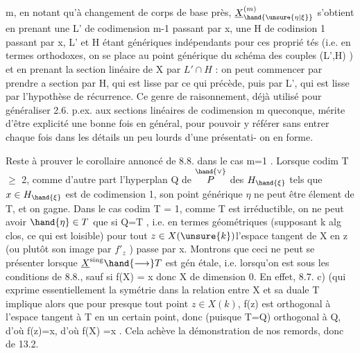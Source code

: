 
\placedmargin{|}m, en notant qu'à changement de corps de base près, $\underline{X}^{(m)}_{\hand{\unsure{\eta|\xi}}}$ s'obtient en
prenant une L' de codimension m-1 passant par x, une H de codinsion
1 passant par x, L' et H étant génériques indépendants pour ces proprié
tés (i.e. en termes orthodoxes, on se place au point générique du 
schéma des couples (L',H)  ) et en prenant la section linéaire
de X par $L'\cap H$ : on peut commencer par prendre a section par H, qui
est lisse par ce qui précède, puis par L', qui est lisse par l'hypothèse
de récurrence. Ce genre de raisonnement, déjà utilisé pour généraliser
2.6. p.ex. aux sections linéaires de codimension m queconque, mérite
d'être explicité une bonne fois en général, pour pouvoir y référer sans
entrer  chaque fois dans les détails un peu lourds d'une présentati-%
on en forme.

Reste à prouver le corollaire annoncé de 8.8. dans le cas m=1 .
Lorsque  codim T $\geqslant$ 2, comme d'autre part l'hyperplan Q de $\overset{\hand{\vee}}{P}$ des
$H_{\hand{\xi}}$ tels que $x\in H_{\hand{\xi}}$ est de codimension 1, son point générique $\eta$ ne peut
être élement de T, et on gagne. Dans le cas codim T = 1, comme T est
irréductible, on ne peut avoir $\hand{\eta}\in T$ que si Q=T ,
i.e. en termes géométriques  (supposant k alg clos, ce qui est loisible) pour tout $z\in X(\unsure{k})$l'espace tangent
de X en z (ou plutôt son image par $f'_{z}$ ) passe par x. Montrons que
ceci ne peut se présenter lorsque $\underline{X}^{\mathrm{sing}}\hand{\longrightarrow}T$ est gén étale, i.e.
lorsqu'on est sous les conditions de 8.8., sauf si f(X) = \hand{\{}x\hand{\}} donc X
de dimension 0. En effet, 8.7. c) (qui exprime essentiellement la
symétrie  dans la relation entre X et sa duale T\hand{)} implique alors que
pour presque tout point $z\in X(k)$, f(z) est orthogonal à l'espace tangent
à T en un certain point, donc (puisque T=Q) orthogonal à Q, d'où f(z)=x, d'où
f(X) =\hand{\{}x\hand{\}} . Cela achève la démonstration de nos remords, donc de 13.2.

